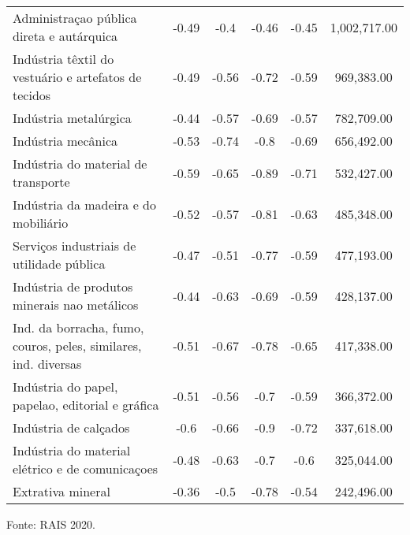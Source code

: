 \begin{table}[htb!]
{\begin{tabular}{lccccc}
Administraçao pública direta e autárquica                           & -0.49         & -0.4     & -0.46     & -0.45     & 1,002,717.00        \\
Indústria têxtil do vestuário e artefatos de tecidos                & -0.49         & -0.56    & -0.72     & -0.59     & 969,383.00          \\
Indústria metalúrgica                                               & -0.44         & -0.57    & -0.69     & -0.57     & 782,709.00          \\
Indústria mecânica                                                  & -0.53         & -0.74    & -0.8      & -0.69     & 656,492.00          \\
Indústria do material de transporte                                 & -0.59         & -0.65    & -0.89     & -0.71     & 532,427.00          \\
Indústria da madeira e do mobiliário                                & -0.52         & -0.57    & -0.81     & -0.63     & 485,348.00          \\
Serviços industriais de utilidade pública                           & -0.47         & -0.51    & -0.77     & -0.59     & 477,193.00          \\
Indústria de produtos minerais nao metálicos                        & -0.44         & -0.63    & -0.69     & -0.59     & 428,137.00          \\
Ind. da borracha, fumo, couros, peles, similares, ind. diversas     & -0.51         & -0.67    & -0.78     & -0.65     & 417,338.00          \\
Indústria do papel, papelao, editorial e gráfica                    & -0.51         & -0.56    & -0.7      & -0.59     & 366,372.00          \\
Indústria de calçados                                               & -0.6          & -0.66    & -0.9      & -0.72     & 337,618.00          \\
Indústria do material elétrico e de comunicaçoes                    & -0.48         & -0.63    & -0.7      & -0.6      & 325,044.00          \\
Extrativa mineral                                                   & -0.36         & -0.5     & -0.78     & -0.54     & 242,496.00          \\ \hline
\end{tabular}%
}
\begin{floatnotes}
\item [Fonte:] RAIS 2020.
\end{floatnotes}
\end{table}